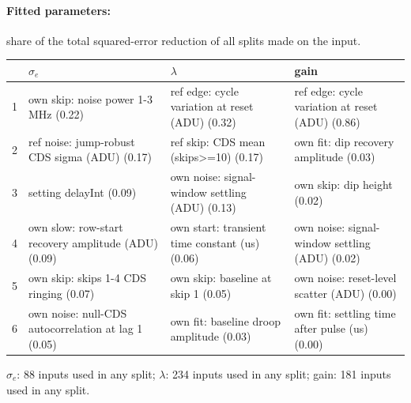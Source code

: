 \paragraph{Fitted parameters:} share of the total squared-error reduction of all splits made on the input.
\begin{center}\footnotesize
\begin{tabular}{rp{}p{}p{}}
\toprule
 & $\sigma_e$ & $\lambda$ & gain \\
\midrule
1 & own skip: noise power 1-3 MHz (0.22) & ref edge: cycle variation at reset (ADU) (0.32) & ref edge: cycle variation at reset (ADU) (0.86) \\
2 & ref noise: jump-robust CDS sigma (ADU) (0.17) & ref skip: CDS mean (skips>=10) (0.17) & own fit: dip recovery amplitude (0.03) \\
3 & setting delayInt (0.09) & own noise: signal-window settling (ADU) (0.13) & own skip: dip height (0.02) \\
4 & own slow: row-start recovery amplitude (ADU) (0.09) & own start: transient time constant (us) (0.06) & own noise: signal-window settling (ADU) (0.02) \\
5 & own skip: skips 1-4 CDS ringing (0.07) & own skip: baseline at skip 1 (0.05) & own noise: reset-level scatter (ADU) (0.00) \\
6 & own noise: null-CDS autocorrelation at lag 1 (0.05) & own fit: baseline droop amplitude (0.03) & own fit: settling time after pulse (us) (0.00) \\
\bottomrule
\end{tabular}
\end{center}
{\footnotesize $\sigma_e$: 88 inputs used in any split; $\lambda$: 234 inputs used in any split; gain: 181 inputs used in any split.}
